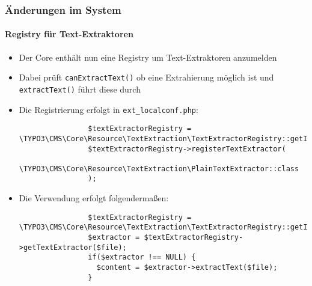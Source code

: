 \begin{frame}[fragile]
	\frametitle{Änderungen im System}
	\framesubtitle{Registry für Text-Extraktoren}

	\lstset{basicstyle=\tiny\ttfamily}

	\begin{itemize}

		\item Der Core enthält nun eine Registry um Text-Extraktoren  anzumelden

		\item Dabei prüft \texttt{canExtractText()} ob eine Extrahierung möglich ist
			und \texttt{extractText()} führt diese durch

		\item Die Registrierung erfolgt in \texttt{ext\_localconf.php}:

			\begin{lstlisting}
				$textExtractorRegistry = \TYPO3\CMS\Core\Resource\TextExtraction\TextExtractorRegistry::getInstance();
				$textExtractorRegistry->registerTextExtractor(
				  \TYPO3\CMS\Core\Resource\TextExtraction\PlainTextExtractor::class
				);
			\end{lstlisting}

		\item Die Verwendung erfolgt folgendermaßen:

			\begin{lstlisting}
				$textExtractorRegistry = \TYPO3\CMS\Core\Resource\TextExtraction\TextExtractorRegistry::getInstance();
				$extractor = $textExtractorRegistry->getTextExtractor($file);
				if($extractor !== NULL) {
				  $content = $extractor->extractText($file);
				}
			\end{lstlisting}
	\end{itemize}

\end{frame}


